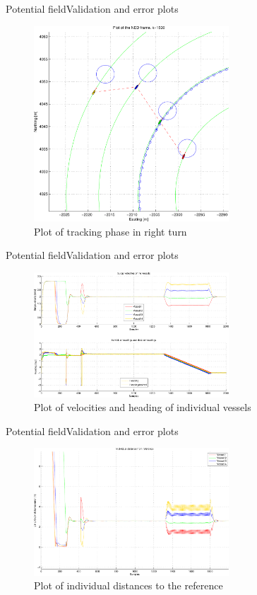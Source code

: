\documentclass[10pt,handout]{beamer}
\begin{document}
\begin{frame}{Potential field}{Validation and error plots}
  \begin{figure}
    \includegraphics[width=0.65\textwidth]{img/pdfsvingstykke}
    \caption{Plot of tracking phase in right turn}
  \end{figure}
\end{frame}

\begin{frame}{Potential field}{Validation and error plots}
  \begin{figure}
    \includegraphics[width=0.65\textwidth]{img/pdfveloghead}
    \caption{Plot of velocities and heading of individual vessels}
  \end{figure}
\end{frame}

\begin{frame}{Potential field}{Validation and error plots}
  \begin{figure}
    \includegraphics[width=0.65\textwidth]{img/pdfdistfromref}
    \caption{Plot of individual distances to the reference}
  \end{figure}
\end{frame}
\end{document}
